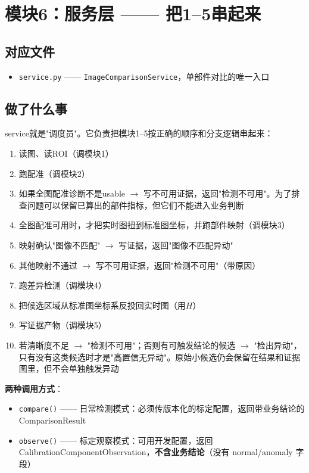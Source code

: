 \documentclass[12pt,a4paper]{ctexart}
\begin{document}
\section{模块6：服务层 —— 把1--5串起来}

\subsection*{对应文件}
\begin{itemize}
\item \texttt{service.py} —— \texttt{ImageComparisonService}，单部件对比的唯一入口
\end{itemize}

\subsection*{做了什么事}

service就是"调度员"。它负责把模块1--5按正确的顺序和分支逻辑串起来：

\begin{enumerate}
\item 读图、读ROI（调模块1）
\item 跑配准（调模块2）
\item 如果全图配准诊断不是usable $\to$ 写不可用证据，返回"检测不可用"。为了排查问题可以保留已算出的部件指标，但它们不能进入业务判断
\item 全图配准可用时，才把实时图扭到标准图坐标，并跑部件映射（调模块3）
\item 映射确认"图像不匹配" $\to$ 写证据，返回"图像不匹配异动"
\item 其他映射不通过 $\to$ 写不可用证据，返回"检测不可用"（带原因）
\item 跑差异检测（调模块4）
\item 把候选区域从标准图坐标系反投回实时图（用$H$）
\item 写证据产物（调模块5）
\item 若清晰度不足 $\to$ "检测不可用"；否则有可触发结论的候选 $\to$ "检出异动"，只有没有这类候选时才是"高置信无异动"。原始小候选仍会保留在结果和证据图里，但不会单独触发异动
\end{enumerate}

\textbf{两种调用方式}：
\begin{itemize}
\item \texttt{compare()} —— 日常检测模式：必须传版本化的标定配置，返回带业务结论的 ComparisonResult
\item \texttt{observe()} —— 标定观察模式：可用开发配置，返回 CalibrationComponentObservation，\textbf{不含业务结论}（没有 normal/anomaly 字段）
\end{itemize}
\end{document}
